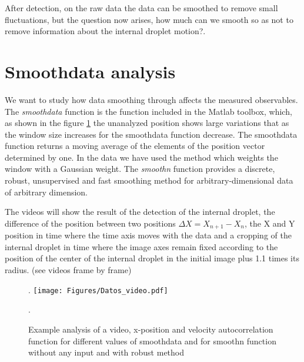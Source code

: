 \documentclass[%
10pt,
superscriptaddress,
twocolumn,
 amsmath,amssymb,
 aps,prx,
]{revtex4-2}
\begin{document}
After detection, on the raw data the data can be smoothed to remove small fluctuations, but the question now arises, how much can we smooth so as not to remove information about the internal droplet motion?.

\section{Smoothdata analysis}
\label{smoothdata}
We want to study how data smoothing through affects the measured observables. The \textit{smoothdata} function is the function included in the Matlab toolbox, which, as shown in the figure \ref{Datos_videos} the unanalyzed position shows large variations that as the window size increases for the smoothdata function decrease. The smoothdata function returns a moving average of the elements of the position vector determined by one. In the data we have used the  method which weights the window with a Gaussian weight.
The \textit{smoothn} function provides a discrete, robust, unsupervised and fast smoothing method for arbitrary-dimensional data of arbitrary dimension.

The videos will show the result of the detection of the internal droplet, the difference of the position between two positions $\Delta X = X_{n+1}-X_{n}$, the X and Y position in time where the time axis moves with the data and a cropping of the internal droplet in time where the image axes remain fixed according to the position of the center of the internal droplet in the initial image plus 1.1 times its radius. (see videos frame by frame)
\begin{figure}[b].
	\texttt{[image: Figures/Datos\_video.pdf]}
	\caption{Example analysis of a video, x-position and velocity autocorrelation function for different values of smoothdata and for smoothn function without any input and with robust method}.
	\label{Datos_videos}
\end{figure}



\end{document}
